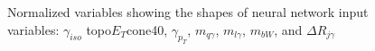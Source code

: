 \begin{figure}[h!]
\vspace{-4.5mm}
\hfil
{}
\caption{Normalized variables showing the shapes of neural network input variables: $\gamma_{iso}$ topo$E_{T}$cone40, $\gamma_{p_T}$, $m_{q \gamma}$, $m_{l \gamma}$, $m_{bW}$, and $\Delta R_{j\gamma}$ }
\label{fig:VarPlots1}
\end{figure}



